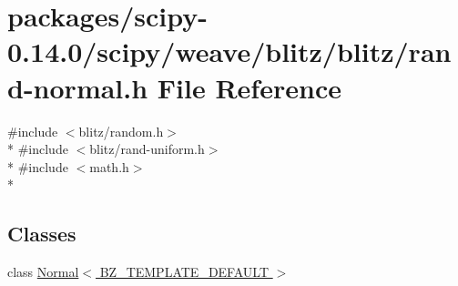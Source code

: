 \hypertarget{rand-normal_8h}{}\section{packages/scipy-\/0.14.0/scipy/weave/blitz/blitz/rand-\/normal.h File Reference}
\label{rand-normal_8h}
{\ttfamily \#include $<$blitz/random.\+h$>$}\\*
{\ttfamily \#include $<$blitz/rand-\/uniform.\+h$>$}\\*
{\ttfamily \#include $<$math.\+h$>$}\\*
\subsection*{Classes}
\begin{DoxyCompactItemize}
\item 
class \hyperlink{classNormal}{Normal$<$ B\+Z\+\_\+\+T\+E\+M\+P\+L\+A\+T\+E\+\_\+\+D\+E\+F\+A\+U\+L\+T $>$}
\end{DoxyCompactItemize}

